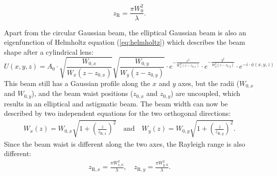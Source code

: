     \begin{equation}
      z_\mathrm{R} = \frac{\pi W_0^2}{\lambda}.
      \label{eq:rayleigh}
    \end{equation}
    


    Apart from the circular Gaussian beam, the elliptical Gaussian beam is also an eigenfunction of Helmholtz equation (\autoref{eq:helmholtz}) which describes the beam shape after a cylindrical lens:
    \begin{equation}
      U(x,y,z) = A_0 \cdot \sqrt{\frac{W_{0,x}}{W_x(z-z_{0,x})}} \sqrt{\frac{W_{0,y}}{W_y(z-z_{0,y})}} \cdot e^{-\frac{x^2}{W_x^2(z-z_{0,x})}} \cdot e^{-\frac{y^2}{W_y^2(z-z_{0,y})}} \cdot e^{-i\cdot \phi(x,y,z)}
    \end{equation}
    This beam still has a Gaussian profile along the $x$ and $y$ axes, but the radii ($W_{0,x}$ and $W_{0,y}$), and the beam waist positions ($z_{0,x}$ and $z_{0,y}$) are uncoupled, which results in an elliptical and astigmatic beam. The beam width can now be described by two independent equations for the two orthogonal directions:
    \begin{align}
      W_x(z) = W_{0,x}\sqrt{1+\left( \frac{z}{z_{\mathrm{R},x}} \right)^2}\mathrm{\quad and \quad } W_y(z) = W_{0,y}\sqrt{1+\left( \frac{z}{z_{\mathrm{R},y}} \right)^2}.
    \end{align}
    Since the beam waist is different along the two axes, the Rayleigh range is also different:
    \begin{align}
      z_{\mathrm{R},x} = \frac{\pi W_{x,0}^2}{\lambda}, \quad
      z_{\mathrm{R},y} = \frac{\pi W_{y,0}^2}{\lambda}.
      \label{eq:rayleighXY}
    \end{align}
    
